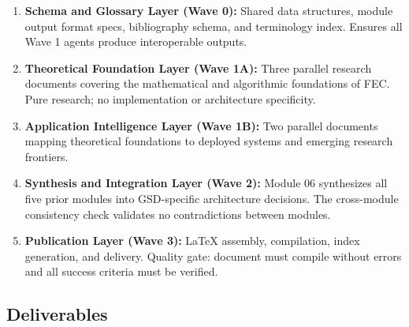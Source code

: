 \documentclass[11pt,letterpaper]{article}
\begin{document}
\begin{enumerate}[leftmargin=*, label=\textbf{Layer \arabic*:}]
  \item \textbf{Schema and Glossary Layer (Wave 0):} Shared data structures, module output format specs, bibliography schema, and terminology index. Ensures all Wave 1 agents produce interoperable outputs.
  \item \textbf{Theoretical Foundation Layer (Wave 1A):} Three parallel research documents covering the mathematical and algorithmic foundations of FEC. Pure research; no implementation or architecture specificity.
  \item \textbf{Application Intelligence Layer (Wave 1B):} Two parallel documents mapping theoretical foundations to deployed systems and emerging research frontiers.
  \item \textbf{Synthesis and Integration Layer (Wave 2):} Module 06 synthesizes all five prior modules into GSD-specific architecture decisions. The cross-module consistency check validates no contradictions between modules.
  \item \textbf{Publication Layer (Wave 3):} LaTeX assembly, compilation, index generation, and delivery. Quality gate: document must compile without errors and all success criteria must be verified.
\end{enumerate}

\subsection{Deliverables}
\end{document}
